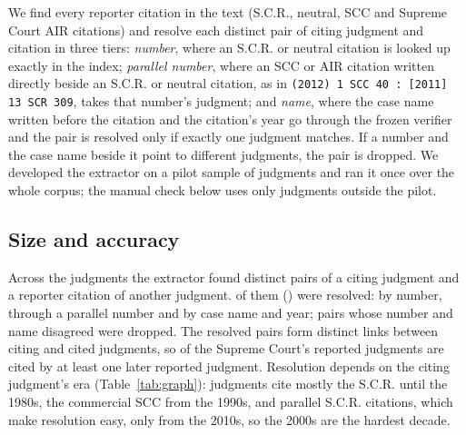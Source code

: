 \documentclass[conference]{IEEEtran}
\begin{document}
We find every reporter citation in the text (S.C.R., neutral, SCC and Supreme Court AIR citations) and resolve each distinct pair of citing judgment and citation in three tiers: \emph{number}, where an S.C.R. or neutral citation is looked up exactly in the index; \emph{parallel number}, where an SCC or AIR citation written directly beside an S.C.R. or neutral citation, as in \texttt{(2012) 1 SCC 40 : [2011] 13 SCR 309}, takes that number's judgment; and \emph{name}, where the case name written before the citation and the citation's year go through the frozen verifier and the pair is resolved only if exactly one judgment matches. If a number and the case name beside it point to different judgments, the pair is dropped. We developed the extractor on a pilot sample of \PilotN{} judgments and ran it once over the whole corpus; the manual check below uses only judgments outside the pilot.

\subsection{Size and accuracy}
\label{sec:graphres}
Across the \GraphTextOK{} judgments the extractor found \GraphUnits{} distinct pairs of a citing judgment and a reporter citation of another judgment. \GraphResolved{} of them (\GraphResolvedPct) were resolved: \GraphExact{} by number, \GraphParallel{} through a parallel number and \GraphName{} by case name and year; \GraphConflict{} pairs whose number and name disagreed were dropped. The resolved pairs form \GraphEdges{} distinct links between \GraphCiting{} citing and \GraphCited{} cited judgments, so \GraphCitedPct{} of the Supreme Court's reported judgments are cited by at least one later reported judgment. Resolution depends on the citing judgment's era (Table~\ref{tab:graph}): judgments cite mostly the S.C.R. until the 1980s, the commercial SCC from the 1990s, and parallel S.C.R. citations, which make resolution easy, only from the 2010s, so the 2000s are the hardest decade.

\begin{table}[t]
\caption{Citations of other reported judgments, by decade of the citing judgment, and how they were resolved.}
\label{tab:graph}
\centering
\footnotesize
\setlength{\tabcolsep}{4pt}

\end{table}
\end{document}
